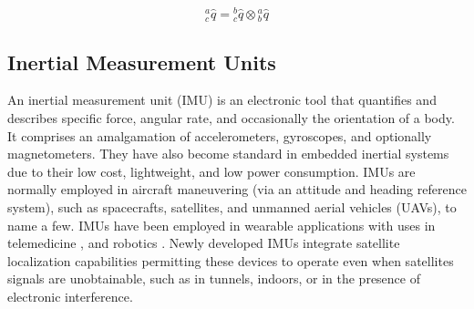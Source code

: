 \begin{equation}
    \textrm{$_{c}^{a}\hat{q}$} = \textrm{$_{c}^{b}\hat{q}$} \otimes \textrm{$_{b}^{a}\hat{q}$}
\end{equation}

\subsection{Inertial Measurement Units}
An inertial measurement unit (IMU) is an electronic tool that quantifies and describes specific force, angular rate, and occasionally the orientation of a body. It comprises an amalgamation of accelerometers, gyroscopes, and optionally magnetometers. They have also become standard in embedded inertial systems due to their low cost, lightweight, and low power consumption. IMUs are normally employed in aircraft maneuvering (via an attitude and heading reference system), such as spacecrafts, satellites, and unmanned aerial vehicles (UAVs), to name a few. IMUs have been employed in wearable applications with uses in  telemedicine \cite{madgwick2020extended}, and robotics \cite{wilson2019formulation}. Newly developed IMUs integrate satellite localization capabilities permitting these devices to operate even when satellites signals are unobtainable, such as in tunnels, indoors, or in the presence of electronic interference.



